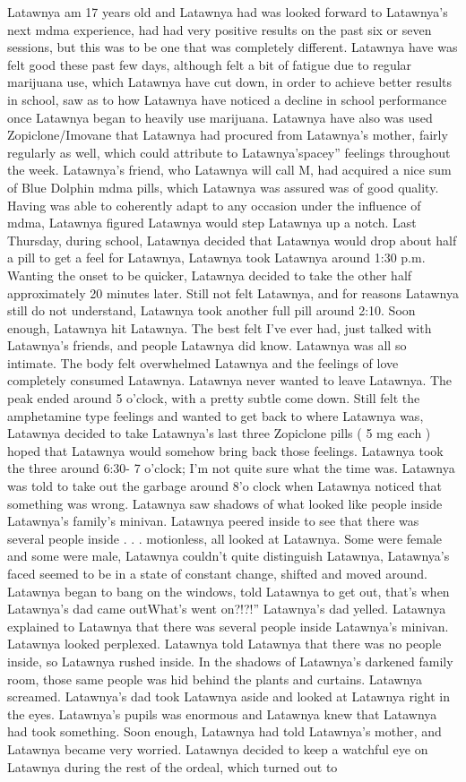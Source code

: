 \documentclass[12pt]{book}
\begin{document}
Latawnya am 17 years old and Latawnya had was looked forward to Latawnya's next mdma experience, had had very positive results on the past six or seven sessions, but this was to be one that was completely different. Latawnya have was felt good these past few days, although felt a bit of fatigue due to regular marijuana use, which Latawnya have cut down, in order to achieve better results in school, saw as to how Latawnya have noticed a decline in school performance once Latawnya began to heavily use marijuana. Latawnya have also was used Zopiclone/Imovane that Latawnya had procured from Latawnya's mother, fairly regularly as well, which could attribute to Latawnya'spacey'' feelings throughout the week. Latawnya's friend, who Latawnya will call M, had acquired a nice sum of Blue Dolphin mdma pills, which Latawnya was assured was of good quality. Having was able to coherently adapt to any occasion under the influence of mdma, Latawnya figured Latawnya would step Latawnya up a notch. Last Thursday, during school, Latawnya decided that Latawnya would drop about half a pill to get a feel for Latawnya, Latawnya took Latawnya around 1:30 p.m. Wanting the onset to be quicker, Latawnya decided to take the other half approximately 20 minutes later. Still not felt Latawnya, and for reasons Latawnya still do not understand, Latawnya took another full pill around 2:10. Soon enough, Latawnya hit Latawnya. The best felt I've ever had, just talked with Latawnya's friends, and people Latawnya did know. Latawnya was all so intimate. The body felt overwhelmed Latawnya and the feelings of love completely consumed Latawnya. Latawnya never wanted to leave Latawnya. The peak ended around 5 o'clock, with a pretty subtle come down. Still felt the amphetamine type feelings and wanted to get back to where Latawnya was, Latawnya decided to take Latawnya's last three Zopiclone pills ( 5 mg each ) hoped that Latawnya would somehow bring back those feelings. Latawnya took the three around 6:30- 7 o'clock; I'm not quite sure what the time was. Latawnya was told to take out the garbage around 8'o clock when Latawnya noticed that something was wrong. Latawnya saw shadows of what looked like people inside Latawnya's family's minivan. Latawnya peered inside to see that there was several people inside . . . motionless, all looked at Latawnya. Some were female and some were male, Latawnya couldn't quite distinguish Latawnya, Latawnya's faced seemed to be in a state of constant change, shifted and moved around. Latawnya began to bang on the windows, told Latawnya to get out, that's when Latawnya's dad came outWhat's went on?!?!'' Latawnya's dad yelled. Latawnya explained to Latawnya that there was several people inside Latawnya's minivan. Latawnya looked perplexed. Latawnya told Latawnya that there was no people inside, so Latawnya rushed inside. In the shadows of Latawnya's darkened family room, those same people was hid behind the plants and curtains. Latawnya screamed. Latawnya's dad took Latawnya aside and looked at Latawnya right in the eyes. Latawnya's pupils was enormous and Latawnya knew that Latawnya had took something. Soon enough, Latawnya had told Latawnya's mother, and Latawnya became very worried. Latawnya decided to keep a watchful eye on Latawnya during the rest of the ordeal, which turned out to 
\end{document}
